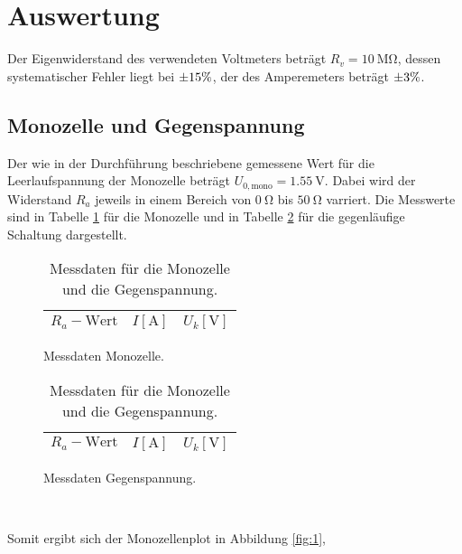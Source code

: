 \section{Auswertung}
\label{sec:Auswertung}
Der Eigenwiderstand des verwendeten Voltmeters beträgt $R_v=\SI{10}{\mega\ohm}$, dessen systematischer Fehler liegt bei $\num{+-15}\%$, der des Amperemeters beträgt $\num{+-3}\%$.
\subsection{Monozelle und Gegenspannung}
Der wie in der Durchführung beschriebene gemessene Wert für die Leerlaufspannung der Monozelle beträgt $U_{0,\text{mono}} = \SI{1.55}{\volt}$.
Dabei wird der Widerstand $R_a$ jeweils in einem Bereich von $\SI{0}{\ohm}$ bis $\SI{50}{\ohm}$ varriert.
Die Messwerte sind in Tabelle \ref{tab:1} für die Monozelle und in Tabelle \ref{tab:2} für die gegenläufige Schaltung dargestellt.
\begin{table}
  \hspace*{\fill}
  \begin{subfigure}{0.40\textwidth}
  \centering
  \caption{Messdaten Monozelle.}
  \label{tab:1}
  \begin{tabular}{c c c}
    \toprule
    {$R_a-\text{Wert}$} & {$I [\si{\ampere}]$} & {$U_k [\si{\volt}]$} \\
    \midrule
    
    \bottomrule
  \end{tabular}
\end{subfigure}
\hspace*{\fill}
\begin{subfigure}{0.40\textwidth}
  \centering
  \caption{Messdaten Gegenspannung.}
  \label{tab:2}
  \begin{tabular}{c c c}
    \toprule
    {$R_a-\text{Wert}$} & {$I [\si{\ampere}]$} & {$U_k [\si{\volt}]$} \\
    \midrule
    
    \bottomrule
  \end{tabular}
\end{subfigure}
\\
\hspace*{\fill}
\hspace*{\fill}
\caption{Messdaten für die Monozelle und die Gegenspannung.}
\end{table}

Somit ergibt sich der Monozellenplot in Abbildung \ref{fig:1},

